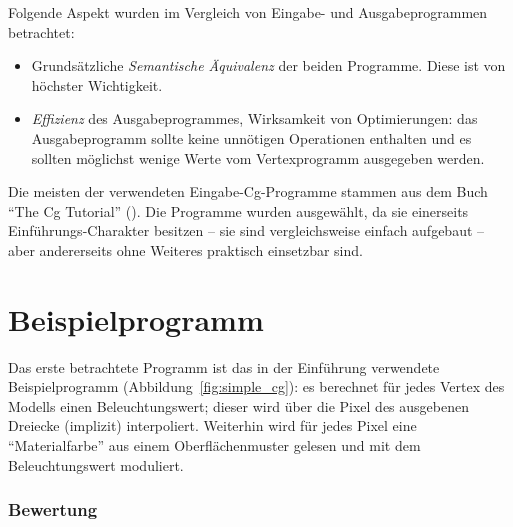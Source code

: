 \documentclass[twoside,a4paper,fleqn,12pt]{book}
\begin{document}
Folgende Aspekt wurden im Vergleich von Eingabe- und Ausgabeprogrammen betrachtet:
\begin{itemize}
\item Grundsätzliche \emph{Semantische Äquivalenz} der beiden Programme. Diese ist von höchster Wichtigkeit.
\item \emph{Effizienz} des Ausgabeprogrammes, Wirksamkeit von Optimierungen: das Ausgabeprogramm sollte keine unnötigen Operationen enthalten und
es sollten möglichst wenige Werte vom Vertexprogramm ausgegeben werden.
\end{itemize}

Die meisten der verwendeten Eingabe-Cg-Programme stammen aus dem Buch ``The Cg Tutorial'' (\cite{cg_tutorial}).
Die Programme wurden ausgewählt, da sie einerseits Einführungs-Charakter besitzen -- sie sind vergleichsweise einfach aufgebaut --
aber andererseits ohne Weiteres praktisch einsetzbar sind.



\section{Beispielprogramm}

Das erste betrachtete Programm ist das in der Einführung verwendete Beispielprogramm (Abbildung~\ref{fig:simple_cg}):
es berechnet für jedes Vertex des Modells einen Beleuchtungswert; dieser wird über die Pixel des ausgebenen
Dreiecke (implizit) interpoliert. Weiterhin wird für jedes Pixel eine "`Materialfarbe"' aus einem Oberflächenmuster gelesen und
mit dem Beleuchtungswert moduliert.


{}

{}

{}

\subsubsection{Bewertung}
\end{document}
